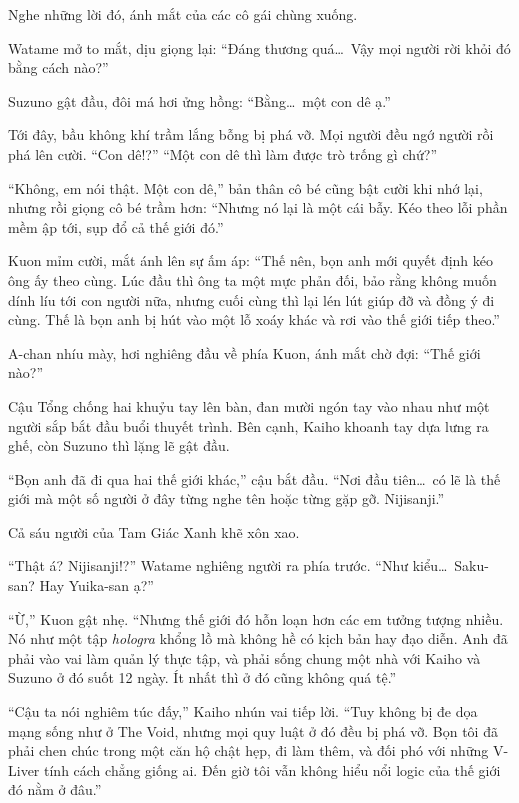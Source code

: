 \documentclass[../main.tex]{subfiles}
\begin{document}
Nghe những lời đó, ánh mắt của các cô gái chùng xuống.

Watame mở to mắt, dịu giọng lại: ``Đáng thương quá\dots\ Vậy mọi người rời khỏi đó bằng cách nào?''

Suzuno gật đầu, đôi má hơi ửng hồng: ``Bằng\dots\ một con dê ạ.''

Tới đây, bầu không khí trầm lắng bỗng bị phá vỡ. Mọi người đều ngớ người rồi phá lên cười. ``Con dê!?'' ``Một con dê thì làm được trò trống gì chứ?''

``Không, em nói thật. Một con dê,'' bản thân cô bé cũng bật cười khi nhớ lại, nhưng rồi giọng cô bé trầm hơn: ``Nhưng nó lại là một cái bẫy. Kéo theo lỗi phần mềm ập tới, sụp đổ cả thế giới đó.''

Kuon mỉm cười, mắt ánh lên sự ấm áp: ``Thế nên, bọn anh mới quyết định kéo ông ấy theo cùng. Lúc đầu thì ông ta một mực phản đối, bảo rằng không muốn dính líu tới con người nữa, nhưng cuối cùng thì lại lén lút giúp đỡ và đồng ý đi cùng. Thế là bọn anh bị hút vào một lỗ xoáy khác và rơi vào thế giới tiếp theo.''

A-chan nhíu mày, hơi nghiêng đầu về phía Kuon, ánh mắt chờ đợi: ``Thế giới nào?''

Cậu Tổng chống hai khuỷu tay lên bàn, đan mười ngón tay vào nhau như một người sắp bắt đầu buổi thuyết trình. Bên cạnh, Kaiho khoanh tay dựa lưng ra ghế, còn Suzuno thì lặng lẽ gật đầu.

``Bọn anh đã đi qua hai thế giới khác,'' cậu bắt đầu. ``Nơi đầu tiên\dots\ có lẽ là thế giới mà một số người ở đây từng nghe tên hoặc từng gặp gỡ. Nijisanji.''

Cả sáu người của Tam Giác Xanh khẽ xôn xao.

``Thật á? Nijisanji!?'' Watame nghiêng người ra phía trước. ``Như kiểu\dots\ Saku-san? Hay Yuika-san ạ?''

``Ừ,'' Kuon gật nhẹ. ``Nhưng thế giới đó hỗn loạn hơn các em tưởng tượng nhiều. Nó như một tập \textit{hologra} khổng lồ mà không hề có kịch bản hay đạo diễn. Anh đã phải vào vai làm quản lý thực tập, và phải sống chung một nhà với Kaiho và Suzuno ở đó suốt 12 ngày. Ít nhất thì ở đó cũng không quá tệ.''

``Cậu ta nói nghiêm túc đấy,'' Kaiho nhún vai tiếp lời. ``Tuy không bị đe dọa mạng sống như ở The Void, nhưng mọi quy luật ở đó đều bị phá vỡ. Bọn tôi đã phải chen chúc trong một căn hộ chật hẹp, đi làm thêm, và đối phó với những V-Liver tính cách chẳng giống ai. Đến giờ tôi vẫn không hiểu nổi logic của thế giới đó nằm ở đâu.''
\end{document}
